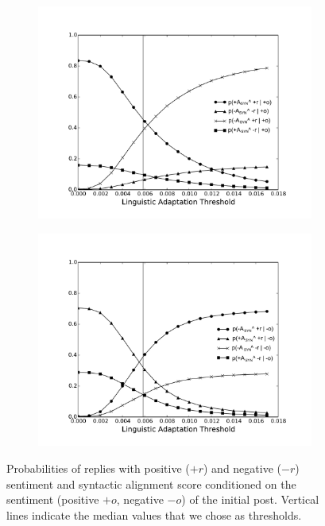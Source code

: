 \begin{figure}[!htb]
\begin{subfigure}{.5\textwidth}
  \centering
  \includegraphics[width=\linewidth]{Figures/SynAposi_new_rob_New_Enlarge.pdf}
  \caption{\label{fig:ProbSynPoso}}
\end{subfigure}%
\begin{subfigure}{.5\textwidth}
  \centering
  \includegraphics[width=\linewidth]{Figures/SynAnegi_new_rob_New_Enlarge.pdf}
  \caption{\label{fig:ProbSynNego}}
\end{subfigure}%
\caption{Probabilities of replies with positive ($+r$) and negative ($-r$) sentiment and syntactic alignment score conditioned on the sentiment (positive $+o$, negative $-o$) of the initial post. Vertical lines indicate the median values that we chose as thresholds.}
\label{fig:Probability_Change_Syn}
\up
\end{figure}


